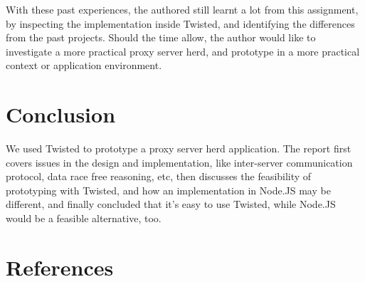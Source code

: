 \documentclass[letterpaper,twocolumn,10pt]{article}
\begin{document}
With these past experiences, the authored still learnt a lot from this assignment, by inspecting the implementation inside Twisted, and identifying the differences from the past projects. Should the time allow, the author would like to investigate a more practical proxy server herd, and prototype in a more practical context or application environment.

\section{Conclusion}

We used Twisted to prototype a proxy server herd application. The report first covers issues in the design and implementation, like inter-server communication protocol, data race free reasoning, etc, then discusses the feasibility of prototyping with Twisted, and how an implementation in Node.JS may be different, and finally concluded that it's easy to use Twisted, while Node.JS would be a feasible alternative, too.

\section{References}

{\footnotesize 
}
\end{document}

